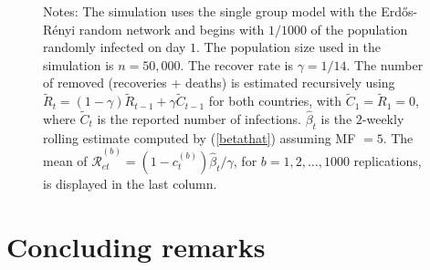 \documentclass[12pt]{article}
\begin{document}
\begin{figure}[p]
\begin{center}
\begin{tabular}
{\includegraphics[
trim=0.000000in -0.660383in 0.000000in 0.000000in,
height=1.9406in,
width=2.2451in
]%
{figs/UK_ER_shift1W_Re.png}%
}
\end{tabular}



\end{center}

%

\vspace{-0.3cm}%
\footnotesize
{}Notes: The simulation uses the single group model with the
Erd\H{o}s-R\'{e}nyi random network and begins with $1/1000$ of the population
randomly infected on day $1$. The population size used in the simulation is
$n=50,000$. The recover rate is $\gamma=1/14$. The number of removed
(recoveries + deaths) is estimated recursively using $\tilde{R}_{t}=\left(
1-\gamma\right)  \tilde{R}_{t-1}+\gamma\tilde{C}_{t-1}$ for both countries,
with $\tilde{C}_{1}=\tilde{R}_{1}=0$, where $\tilde{C}_{t}$ is the reported
number of infections. $\hat{\beta}_{t}$ is the $2$-weekly rolling estimate
computed by (\ref{betathat}) assuming MF $=5$. The mean of $\mathcal{\hat{R}%
}_{et}^{(b)}=\left(  1-c_{t}^{(b)}\right)  \hat{\beta}_{t}/\gamma$, for
$b=1,2,\ldots,1000$ replications, is displayed in the last column.%

\end{figure}%


\section{Concluding remarks \label{Sec: conclusion}}
\end{document}
